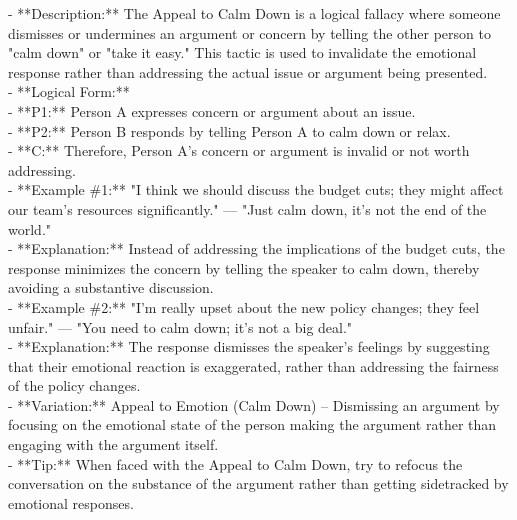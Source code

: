 \documentclass[a4paper,12pt,single,pdftex]{scrartcl}
\begin{document}
  
    
      - **Description:** The Appeal to Calm Down is a logical fallacy where someone dismisses or undermines an argument or concern by telling the other person to "calm down" or "take it easy." This tactic is used to invalidate the emotional response rather than addressing the actual issue or argument being presented.
    \\

    
      - **Logical Form:**
    \\

    
        - **P1:** Person A expresses concern or argument about an issue.
    \\

    
        - **P2:** Person B responds by telling Person A to calm down or relax.
    \\

    
        - **C:** Therefore, Person A's concern or argument is invalid or not worth addressing.
    \\

    
      - **Example \#1:** "I think we should discuss the budget cuts; they might affect our team's resources significantly." — "Just calm down, it's not the end of the world."
    \\

    
      - **Explanation:** Instead of addressing the implications of the budget cuts, the response minimizes the concern by telling the speaker to calm down, thereby avoiding a substantive discussion.
    \\

    
      - **Example \#2:** "I'm really upset about the new policy changes; they feel unfair." — "You need to calm down; it's not a big deal."
    \\

    
      - **Explanation:** The response dismisses the speaker's feelings by suggesting that their emotional reaction is exaggerated, rather than addressing the fairness of the policy changes.
    \\

    
      - **Variation:** Appeal to Emotion (Calm Down) – Dismissing an argument by focusing on the emotional state of the person making the argument rather than engaging with the argument itself.
    \\

    
      - **Tip:** When faced with the Appeal to Calm Down, try to refocus the conversation on the substance of the argument rather than getting sidetracked by emotional responses.
    \\
\end{document}
